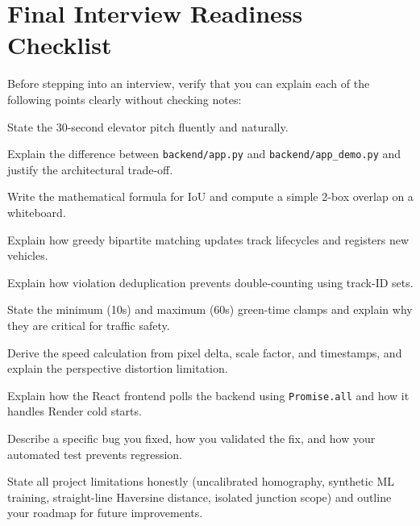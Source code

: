 \section{Final Interview Readiness Checklist}
\label{sec:glossary_checklist}

Before stepping into an interview, verify that you can explain each of the following points clearly without checking notes:

\begin{checklist}
    \item State the 30-second elevator pitch fluently and naturally.
    \item Explain the difference between \texttt{backend/app.py} and \texttt{backend/app\_demo.py} and justify the architectural trade-off.
    \item Write the mathematical formula for IoU and compute a simple 2-box overlap on a whiteboard.
    \item Explain how greedy bipartite matching updates track lifecycles and registers new vehicles.
    \item Explain how violation deduplication prevents double-counting using track-ID sets.
    \item State the minimum (10s) and maximum (60s) green-time clamps and explain why they are critical for traffic safety.
    \item Derive the speed calculation from pixel delta, scale factor, and timestamps, and explain the perspective distortion limitation.
    \item Explain how the React frontend polls the backend using \texttt{Promise.all} and how it handles Render cold starts.
    \item Describe a specific bug you fixed, how you validated the fix, and how your automated test prevents regression.
    \item State all project limitations honestly (uncalibrated homography, synthetic ML training, straight-line Haversine distance, isolated junction scope) and outline your roadmap for future improvements.
\end{checklist}
